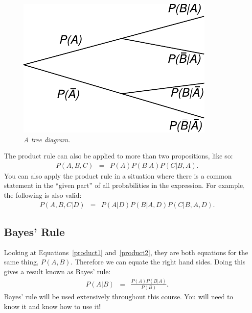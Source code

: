 \begin{figure}[ht!]
\begin{center}
\includegraphics[scale=0.9]{Figures/tree_diagram.pdf}
\caption{\it A tree diagram.\label{fig:tree_diagram}}
\end{center}
\end{figure}

The product rule can also be applied to more than two propositions, like so:
\begin{eqnarray}
P(A, B, C) &=& P(A)P(B|A)P(C|B,A).
\end{eqnarray}
You can also apply the product rule in a situation where there is a common
statement in the ``given part'' of all probabilities in the expression. For
example, the following is also valid:
\begin{eqnarray}
P(A, B, C | D) &=& P(A |D)P(B|A,D)P(C|B,A,D).
\end{eqnarray}


\subsection{Bayes' Rule}
Looking at Equations~\ref{product1} and~\ref{product2}, they are both equations
for the same
thing, $P(A,B)$. Therefore we can equate the right hand sides. Doing this gives
a result known as Bayes' rule:
\begin{eqnarray}
P(A|B) &=& \frac{P(A)P(B|A)}{P(B)}. \label{bayes}
\end{eqnarray}
Bayes' rule will be used extensively throughout this course. You will need to
know it and know how to use it!


